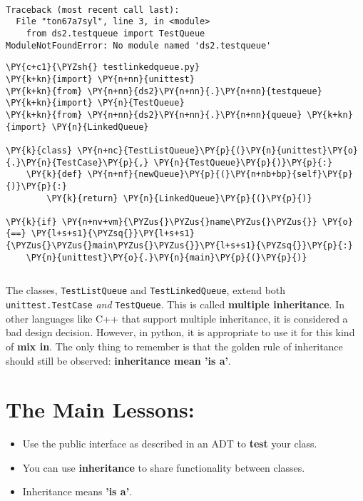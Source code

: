 \begin{Verbatim}

Traceback (most recent call last):
  File "ton67a7syl", line 3, in <module>
    from ds2.testqueue import TestQueue
ModuleNotFoundError: No module named 'ds2.testqueue'

\end{Verbatim}


\begin{Verbatim}[commandchars=\\\{\}]
\PY{c+c1}{\PYZsh{} testlinkedqueue.py}
\PY{k+kn}{import} \PY{n+nn}{unittest}
\PY{k+kn}{from} \PY{n+nn}{ds2}\PY{n+nn}{.}\PY{n+nn}{testqueue} \PY{k+kn}{import} \PY{n}{TestQueue}
\PY{k+kn}{from} \PY{n+nn}{ds2}\PY{n+nn}{.}\PY{n+nn}{queue} \PY{k+kn}{import} \PY{n}{LinkedQueue}

\PY{k}{class} \PY{n+nc}{TestListQueue}\PY{p}{(}\PY{n}{unittest}\PY{o}{.}\PY{n}{TestCase}\PY{p}{,} \PY{n}{TestQueue}\PY{p}{)}\PY{p}{:}
    \PY{k}{def} \PY{n+nf}{newQueue}\PY{p}{(}\PY{n+nb+bp}{self}\PY{p}{)}\PY{p}{:}
        \PY{k}{return} \PY{n}{LinkedQueue}\PY{p}{(}\PY{p}{)}

\PY{k}{if} \PY{n+nv+vm}{\PYZus{}\PYZus{}name\PYZus{}\PYZus{}} \PY{o}{==} \PY{l+s+s1}{\PYZsq{}}\PY{l+s+s1}{\PYZus{}\PYZus{}main\PYZus{}\PYZus{}}\PY{l+s+s1}{\PYZsq{}}\PY{p}{:}
    \PY{n}{unittest}\PY{o}{.}\PY{n}{main}\PY{p}{(}\PY{p}{)}
\end{Verbatim}

\begin{Verbatim}

\end{Verbatim}


The classes, \texttt{TestListQueue} and \texttt{TestLinkedQueue}, extend both \texttt{unittest.TestCase} \emph{and} \texttt{TestQueue}.
This is called \textbf{multiple inheritance}.
In other languages like C++ that support multiple inheritance, it is considered a bad design decision.
However, in python, it is appropriate to use it for this kind of \textbf{mix in}.
The only thing to remember is that the golden rule of inheritance should still be observed: \textbf{inheritance mean 'is a'}.

\section{The Main Lessons:}

\begin{itemize}

\item Use the public interface as described in an ADT to \textbf{test} your class.

\item You can use \textbf{inheritance} to share functionality between classes.

\item Inheritance means \textbf{'is a'}.

\end{itemize}
